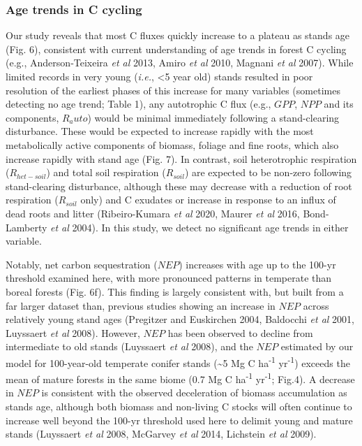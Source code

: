 \documentclass[
]{article}
\begin{document}
\hypertarget{age-trends-in-c-cycling}{%
\subsubsection{Age trends in C cycling}\label{age-trends-in-c-cycling}}

Our study reveals that most C fluxes quickly increase to a plateau as
stands age (Fig. 6), consistent with current understanding of age trends
in forest C cycling (e.g., Anderson‐Teixeira \emph{et al} 2013, Amiro
\emph{et al} 2010, Magnani \emph{et al} 2007). While limited records in
very young (\emph{i.e.}, \textless5 year old) stands resulted in poor
resolution of the earliest phases of this increase for many variables
(sometimes detecting no age trend; Table 1), any autotrophic C flux
(e.g., \(GPP\), \(NPP\) and its components, \(R_auto\)) would be minimal
immediately following a stand-clearing disturbance. These would be
expected to increase rapidly with the most metabolically active
components of biomass, foliage and fine roots, which also increase
rapidly with stand age (Fig. 7). In contrast, soil heterotrophic
respiration (\(R_{het-soil}\)) and total soil respiration (\(R_{soil}\))
are expected to be non-zero following stand-clearing disturbance,
although these may decrease with a reduction of root respiration
(\(R_{soil}\) only) and C exudates or increase in response to an influx
of dead roots and litter (Ribeiro-Kumara \emph{et al} 2020, Maurer
\emph{et al} 2016, Bond-Lamberty \emph{et al} 2004). In this study, we
detect no significant age trends in either variable.

Notably, net carbon sequestration (\(NEP\)) increases with age up to the
100-yr threshold examined here, with more pronounced patterns in
temperate than boreal forests (Fig. 6f). This finding is largely
consistent with, but built from a far larger dataset than, previous
studies showing an increase in \(NEP\) across relatively young stand
ages (Pregitzer and Euskirchen 2004, Baldocchi \emph{et al} 2001,
Luyssaert \emph{et al} 2008). However, \(NEP\) has been observed to
decline from intermediate to old stands (Luyssaert \emph{et al} 2008),
and the \(NEP\) estimated by our model for 100-year-old temperate
conifer stands (\textasciitilde5 Mg C ha\textsuperscript{-1}
yr\textsuperscript{-1}) exceeds the mean of mature forests in the same
biome (0.7 Mg C ha\textsuperscript{-1} yr\textsuperscript{-1}; Fig.4). A
decrease in \(NEP\) is consistent with the observed deceleration of
biomass accumulation as stands age, although both biomass and non-living
C stocks will often continue to increase well beyond the 100-yr
threshold used here to delimit young and mature stands (Luyssaert
\emph{et al} 2008, McGarvey \emph{et al} 2014, Lichstein \emph{et al}
2009).
\end{document}
